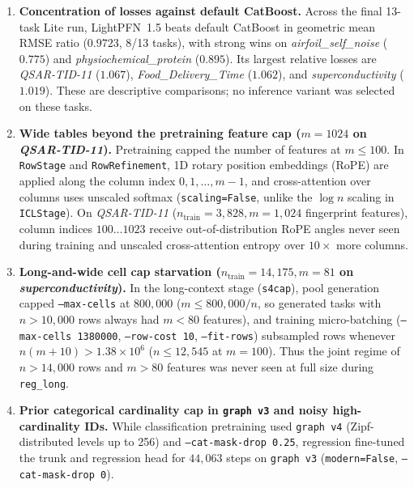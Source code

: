 \documentclass[11pt]{article}
\begin{document}
\begin{enumerate}
\item \textbf{Concentration of losses against default CatBoost.}
Across the final 13-task Lite run, LightPFN~1.5 beats default CatBoost in geometric mean RMSE ratio ($0.9723$, 8/13 tasks), with strong wins on \emph{airfoil\_self\_noise} ($0.775$) and \emph{physiochemical\_protein} ($0.895$). Its largest relative losses are \emph{QSAR-TID-11} ($1.067$), \emph{Food\_Delivery\_Time} ($1.062$), and \emph{superconductivity} ($1.019$). These are descriptive comparisons; no inference variant was selected on these tasks. %
\item \textbf{Wide tables beyond the pretraining feature cap ($m = 1024$ on \emph{QSAR-TID-11}).}
Pretraining capped the number of features at $m \le 100$.
In \texttt{RowStage} and \texttt{RowRefinement}, 1D rotary position embeddings (RoPE) \cite{su2024} are applied along the column index $0, 1, \dots, m-1$, and cross-attention over columns uses unscaled softmax (\texttt{scaling=False}, unlike the $\log n$ scaling in \texttt{ICLStage}). %
On \emph{QSAR-TID-11} ($n_{\text{train}}=3{,}828, m=1{,}024$ fingerprint features), column indices $100\dots 1023$ receive out-of-distribution RoPE angles never seen during training and unscaled cross-attention entropy over $10\times$ more columns. %
\item \textbf{Long-and-wide cell cap starvation ($n_{\text{train}}=14{,}175, m=81$ on \emph{superconductivity}).}
In the long-context stage (\texttt{s4cap}), pool generation capped \texttt{--max-cells} at $800{,}000$ ($m \le 800{,}000 / n$, so generated tasks with $n > 10{,}000$ rows always had $m < 80$ features), and training micro-batching (\texttt{--max-cells 1380000}, \texttt{--row-cost 10}, \texttt{--fit-rows}) subsampled rows whenever $n(m+10) > 1.38\times 10^6$ ($n \le 12{,}545$ at $m=100$). %
Thus the joint regime of $n > 14{,}000$ rows and $m > 80$ features was never seen at full size during \texttt{reg\_long}.
\item \textbf{Prior categorical cardinality cap in \texttt{graph v3} and noisy high-cardinality IDs.}
While classification pretraining used \texttt{graph v4} (Zipf-distributed levels up to 256) and \texttt{--cat-mask-drop 0.25}, regression fine-tuned the trunk and regression head for $44{,}063$ steps on \texttt{graph v3} (\texttt{modern=False}, \texttt{--cat-mask-drop 0}).

\end{enumerate}
\end{document}
